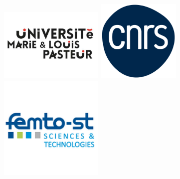\includegraphics[width=5cm]{MainLayout/Images/chapter0/logo_univ.pdf}
\hspace*{1cm}
\includegraphics[width=4cm]{MainLayout/Images/chapter0/LOGO_CNRS.png}
\hspace*{1cm}
\includegraphics[width=5cm]{MainLayout/Images/chapter0/logo_femto.png}
\hfill

\vspace*{0mm}

